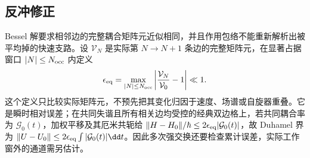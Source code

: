 \subsection{反冲修正}

Bessel 解要求相邻边的完整耦合矩阵元近似相同，并且作用包络不能重新解析出被平均掉的快速支路。设 $\mathcal V_N$ 是实际第 $N\to N+1$ 条边的完整矩阵元，在显著占据窗口 $|N|\le N_{\rm occ}$ 内定义
\begin{equation}
{
\epsilon_{\rm eq}
=\max_{|N|\le N_{\rm occ}}
\left|\frac{\mathcal V_N}{\mathcal V_0}-1\right|\ll1.}
\label{eq:feist2015_equal_rabi_recoil_condition}
\end{equation}
这个定义只比较实际矩阵元，不预先把其变化归因于速度、场谱或自旋器重叠。它是瞬时相对误差；在共同失谐且所有相关边均受控的经典双边格上，若共同耦合率为 $\mathcal G_0(t)$，加权平移及其厄米共轭给 $\|H-H_0\|/\hbar\le2\epsilon_{\rm eq}|\mathcal G_0(t)|$，故 Duhamel 界为 $\|U-U_0\|\le2\epsilon_{\rm eq}\int|\mathcal G_0(t)|\dd t$。因此多次强交换还要检查累计误差，实际工作窗外的通道需另估计。

